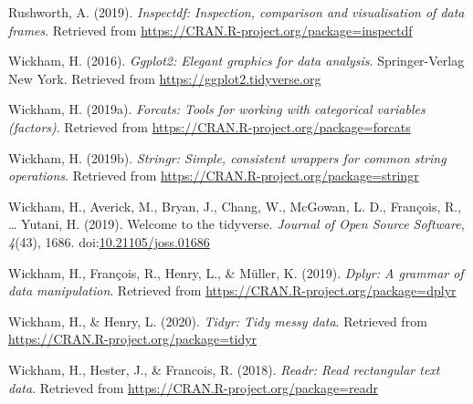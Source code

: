 \documentclass[man]{apa6}
\begin{document}
\leavevmode\hypertarget{ref-R-inspectdf}{}%
Rushworth, A. (2019). \emph{Inspectdf: Inspection, comparison and visualisation of data frames}. Retrieved from \url{https://CRAN.R-project.org/package=inspectdf}

\leavevmode\hypertarget{ref-R-ggplot2}{}%
Wickham, H. (2016). \emph{Ggplot2: Elegant graphics for data analysis}. Springer-Verlag New York. Retrieved from \url{https://ggplot2.tidyverse.org}

\leavevmode\hypertarget{ref-R-forcats}{}%
Wickham, H. (2019a). \emph{Forcats: Tools for working with categorical variables (factors)}. Retrieved from \url{https://CRAN.R-project.org/package=forcats}

\leavevmode\hypertarget{ref-R-stringr}{}%
Wickham, H. (2019b). \emph{Stringr: Simple, consistent wrappers for common string operations}. Retrieved from \url{https://CRAN.R-project.org/package=stringr}

\leavevmode\hypertarget{ref-R-tidyverse}{}%
Wickham, H., Averick, M., Bryan, J., Chang, W., McGowan, L. D., François, R., \ldots{} Yutani, H. (2019). Welcome to the tidyverse. \emph{Journal of Open Source Software}, \emph{4}(43), 1686. doi:\href{https://doi.org/10.21105/joss.01686}{10.21105/joss.01686}

\leavevmode\hypertarget{ref-R-dplyr}{}%
Wickham, H., François, R., Henry, L., \& Müller, K. (2019). \emph{Dplyr: A grammar of data manipulation}. Retrieved from \url{https://CRAN.R-project.org/package=dplyr}

\leavevmode\hypertarget{ref-R-tidyr}{}%
Wickham, H., \& Henry, L. (2020). \emph{Tidyr: Tidy messy data}. Retrieved from \url{https://CRAN.R-project.org/package=tidyr}

\leavevmode\hypertarget{ref-R-readr}{}%
Wickham, H., Hester, J., \& Francois, R. (2018). \emph{Readr: Read rectangular text data}. Retrieved from \url{https://CRAN.R-project.org/package=readr}

\endgroup
\end{document}
